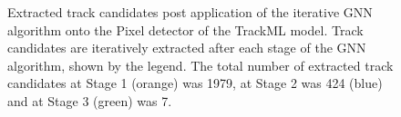 \begin{figure}[htbp]%
    \centering
    \hfill
    \centering
    \caption{Extracted track candidates post application of the iterative GNN algorithm onto the Pixel detector of the TrackML model. Track candidates are iteratively extracted after each stage of the GNN algorithm, shown by the legend. The total number of extracted track candidates at Stage 1 (orange) was 1979, at Stage 2 was 424 (blue) and at Stage 3 (green) was 7.}%
    \label{fig:trackml-results-barrel-endcap}%
\end{figure}






